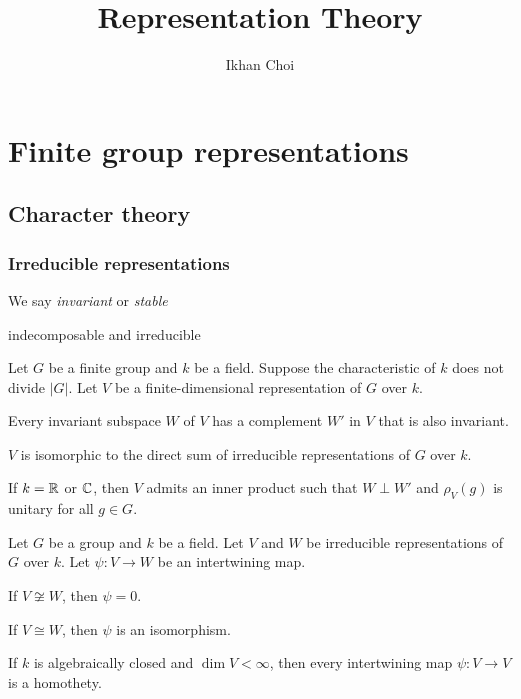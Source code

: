 \documentclass{../../large}
\begin{document}
\title{Representation Theory}
\author{Ikhan Choi}
\maketitle
\tableofcontents

\part{Finite group representations}
\chapter{Character theory}

\section{Irreducible representations}
\begin{prb}
\end{prb}

\begin{prb}
\end{prb}

\begin{prb}[Subrepresentations]
We say \emph{invariant} or \emph{stable}
\end{prb}

\begin{prb}
indecomposable and irreducible
\end{prb}

\begin{prb}
Let $G$ be a finite group and $k$ be a field.
Suppose the characteristic of $k$ does not divide $|G|$.
Let $V$ be a finite-dimensional representation of $G$ over $k$.
\begin{parts}
\item Every invariant subspace $W$ of $V$ has a complement $W'$ in $V$ that is also invariant.
\item $V$ is isomorphic to the direct sum of irreducible representations of $G$ over $k$.
\item If $k=\mathbb{R}$ or $\mathbb{C}$, then $V$ admits an inner product such that $W\perp W'$ and $\rho_V(g)$ is unitary for all $g\in G$.
\end{parts}
\end{prb}

\begin{prb}
Let $G$ be a group and $k$ be a field.
Let $V$ and $W$ be irreducible representations of $G$ over $k$.
Let $\psi:V\to W$ be an intertwining map.
\begin{parts}
\item If $V\not\cong W$, then $\psi=0$.
\item If $V\cong W$, then $\psi$ is an isomorphism.
\item If $k$ is algebraically closed and $\dim V<\infty$, then every intertwining map $\psi:V\to V$ is a homothety.
\end{parts}
\end{prb}
\end{document}
